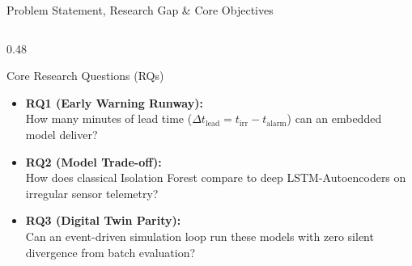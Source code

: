 \documentclass[aspectratio=169, 10pt]{beamer}
\begin{document}
\begin{frame}{Problem Statement, Research Gap \& Core Objectives}
\begin{columns}[T]
        \begin{column}{0.48\textwidth}
            \begin{exampleblock}{Core Research Questions (RQs)}
                \begin{itemize}\small
                    \item \textbf{RQ1 (Early Warning Runway):}\\
                    How many minutes of lead time ($\Delta t_{\text{lead}} = t_{\text{irr}} - t_{\text{alarm}}$) can an embedded model deliver?
                    \item \textbf{RQ2 (Model Trade-off):}\\
                    How does classical Isolation Forest compare to deep LSTM-Autoencoders on irregular sensor telemetry?
                    \item \textbf{RQ3 (Digital Twin Parity):}\\
                    Can an event-driven simulation loop run these models with zero silent divergence from batch evaluation?
                \end{itemize}
            \end{exampleblock}
        \end{column}
    \end{columns}
\end{frame}
\end{document}
